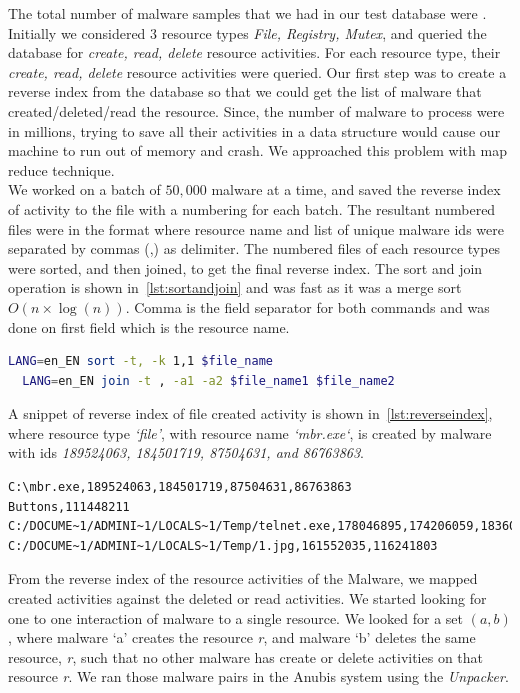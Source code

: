 The total number of malware samples that we had in our test database were \textbf{\gettotalmalwarei{}}.
Initially we considered 3 resource types \textit{File, Registry, Mutex}, and queried the database for \textit{create, read, delete} resource activities.
For each resource type, their \textit{create, read, delete} resource activities were queried.
Our first step was to create a reverse index from the database so that we could get the list of malware that created/deleted/read the resource.
Since, the number of malware to process were in millions, trying to save all their activities in a data structure would cause our machine to run out of memory and crash.
We approached this problem with map reduce technique.\\

We worked on a batch of $50,000$ malware at a time, and saved the reverse index of activity to the file with a numbering for each batch.
The resultant numbered files were in the format where resource name and list of unique malware ids were separated by commas (,) as delimiter.
The numbered files of each resource types were sorted, and then joined, to get the final reverse index.
The sort and join operation is shown in~\autoref{lst:sortandjoin} and was fast as it was a merge sort $O( n \times \log(n))$.
Comma is the field separator for both commands and was done on first field which is the resource name.\\

\begin{lstlisting}[numbers=none,language=bash,caption={Sort and join the reverse index},label={lst:sortandjoin}]
  LANG=en_EN sort -t, -k 1,1 $file_name
  LANG=en_EN join -t , -a1 -a2 $file_name1 $file_name2
\end{lstlisting}
A snippet of reverse index of file created activity is shown in~\autoref{lst:reverseindex}, where resource type \emph{`file'}, with resource name \emph{`mbr.exe`}, is created by malware with ids \emph{189524063, 184501719, 87504631, and 86763863}.
\begin{lstlisting}[numbers=none,caption={Sample of reverse index created for File activity},label={lst:reverseindex}]
C:\mbr.exe,189524063,184501719,87504631,86763863
Buttons,111448211
C:/DOCUME~1/ADMINI~1/LOCALS~1/Temp/telnet.exe,178046895,174206059,183601891,89650247
C:/DOCUME~1/ADMINI~1/LOCALS~1/Temp/1.jpg,161552035,116241803
\end{lstlisting}

From the reverse index of the resource activities of the Malware, we mapped created activities against the deleted or read activities.
We started looking for one to one interaction of malware to a single resource.
We looked for a set $(a, b)$, where malware `a' creates the resource \emph{r}, and malware `b' deletes the same resource, \emph{r}, such that no other malware has create or delete activities on that resource \emph{r}. We ran those malware pairs in the Anubis system using the \emph{Unpacker}.
